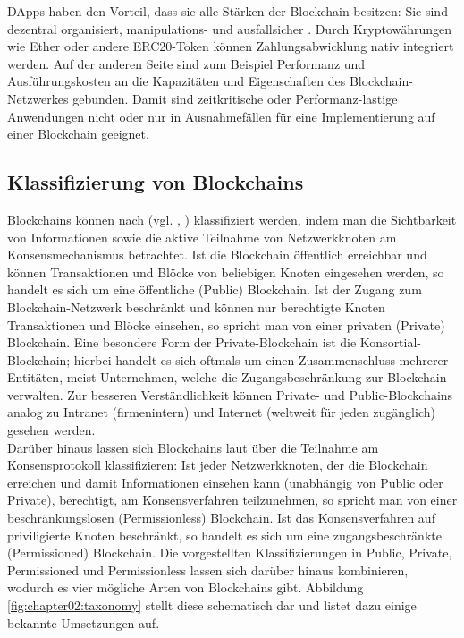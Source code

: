 \ac{DApp}s haben den Vorteil, dass sie alle Stärken der Blockchain besitzen: Sie sind dezentral organisiert, manipulations- und ausfallsicher \cite{DAPPS2016}. Durch Kryptowährungen wie Ether oder andere ERC20-Token können Zahlungsabwicklung nativ integriert werden. Auf der anderen Seite sind zum Beispiel Performanz und Ausführungskosten an die Kapazitäten und Eigenschaften des Blockchain-Netzwerkes gebunden. Damit sind zeitkritische oder Performanz-lastige Anwendungen nicht oder nur in Ausnahmefällen für eine Implementierung auf einer Blockchain geeignet.

\subsection{Klassifizierung von Blockchains}
\label{subsec:fundamentals:dlt:classification}
Blockchains können nach \citeauthor{overview2017} (vgl. , \cite{overview2017}) klassifiziert werden, indem man die Sichtbarkeit von Informationen sowie die aktive Teilnahme von Netzwerkknoten am Konsensmechanismus betrachtet. Ist die Blockchain öffentlich erreichbar und können Transaktionen und Blöcke von beliebigen Knoten eingesehen werden, so handelt es sich um eine öffentliche (Public) Blockchain. Ist der Zugang zum Blockchain-Netzwerk beschränkt und können nur berechtigte Knoten Transaktionen und Blöcke einsehen, so spricht man von einer privaten (Private) Blockchain. Eine besondere Form der Private-Blockchain ist die Konsortial-Blockchain; hierbei handelt es sich oftmals um einen Zusammenschluss mehrerer Entitäten, meist Unternehmen, welche die Zugangsbeschränkung zur Blockchain verwalten. Zur besseren Verständlichkeit können Private- und Public-Blockchains analog zu Intranet (firmenintern) und Internet (weltweit für jeden zugänglich) gesehen werden.\\
Darüber hinaus lassen sich Blockchains laut \citeauthor{overview2017} über die Teilnahme am Konsensprotokoll klassifizieren: Ist jeder Netzwerkknoten, der die Blockchain erreichen und damit Informationen einsehen kann (unabhängig von Public oder Private), berechtigt, am Konsensverfahren teilzunehmen, so spricht man von einer beschränkungslosen (Permissionless) Blockchain. Ist das Konsensverfahren auf priviligierte Knoten beschränkt, so handelt es sich um eine zugangsbeschränkte (Permissioned) Blockchain. Die vorgestellten Klassifizierungen in Public, Private, Permissioned und Permissionless lassen sich darüber hinaus kombinieren, wodurch es vier mögliche Arten von Blockchains gibt. Abbildung \ref{fig:chapter02:taxonomy} stellt diese schematisch dar und listet dazu einige bekannte Umsetzungen auf.

